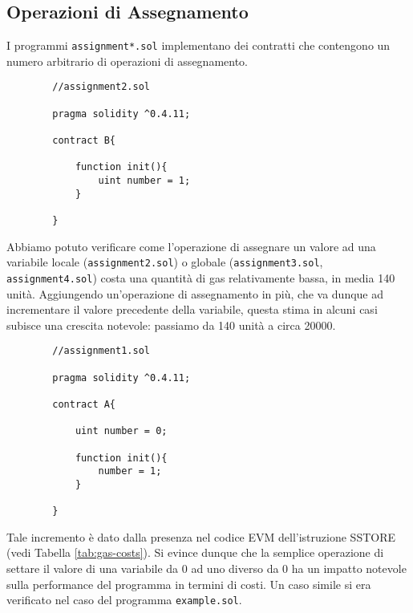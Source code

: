     \subsection{Operazioni di Assegnamento}
    
    I programmi \verb|assignment*.sol| implementano dei contratti che contengono un numero arbitrario di operazioni di assegnamento.
    
    \begin{minipage}{\linewidth}
        \begin{lstlisting}
        //assignment2.sol
        
        pragma solidity ^0.4.11;

        contract B{

            function init(){
                uint number = 1;    
            }

        }

        \end{lstlisting}
    \end{minipage}

    
    Abbiamo potuto verificare come l'operazione di assegnare un valore ad una variabile locale (\verb|assignment2.sol|) o globale (\verb|assignment3.sol|, \verb|assignment4.sol|) costa una quantità di gas relativamente bassa, in media 140 unità.
    Aggiungendo un'operazione di assegnamento in più, che va dunque ad incrementare il valore precedente della variabile, questa stima in alcuni casi subisce una crescita notevole: passiamo da 140 unità a circa 20000.
    
    \begin{minipage}{\linewidth}
        \begin{lstlisting}
        //assignment1.sol
        
        pragma solidity ^0.4.11;

        contract A{

            uint number = 0;

            function init(){
                number = 1;    
            }

        }

        \end{lstlisting} 
    \end{minipage}

    
    Tale incremento è dato dalla presenza nel codice EVM dell'istruzione SSTORE (vedi Tabella \ref{tab:gas-costs}). Si evince dunque che la semplice operazione di settare il valore di una variabile da 0 ad uno diverso da 0 ha un impatto notevole sulla performance del programma in termini di costi. Un caso simile si era verificato nel caso del programma \verb|example.sol|.

